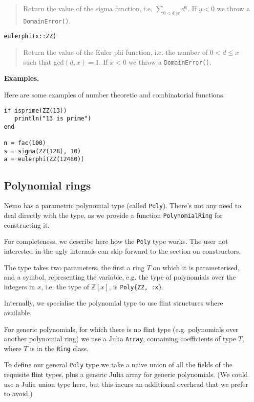 \documentclass[a4paper,10pt]{article}
\newcommand{\Z}{\mathbb{Z}}
\newcommand{\code}{\lstinline}
\newcommand{\desc}[1]{\vspace{-3mm}\begin{quote}#1\end{quote}}
\begin{document}
{{{\desc{Return the value of the sigma function, i.e. $\sum_{0 < d \;| x} d^y$. If $y < 0$
we throw a \code{DomainError()}.}

\begin{lstlisting}
eulerphi(x::ZZ)
\end{lstlisting}

\desc{Return the value of the Euler phi function, i.e. the number of $0 < d \leq x$ such
that gcd$(d, x) = 1$. If $x < 0$ we throw a \code{DomainError()}.}

\textbf{Examples.}

Here are some examples of number theoretic and combinatorial functions.

\begin{lstlisting}
if isprime(ZZ(13))
   println("13 is prime")
end

n = fac(100)
s = sigma(ZZ(128), 10)
a = eulerphi(ZZ(12480))
\end{lstlisting}

\subsection{Polynomial rings}

Nemo has a parametric polynomial type (called \code{Poly}). There's not any need to deal
directly with the type, as we provide a function \code{PolynomialRing} for constructing
it.

For completeness, we describe here how the \code{Poly} type works. The user not interested
in the ugly internals can skip forward to the section on constructors.

The type takes two parameters, the first a ring $T$ on which it is parameterised, and a
symbol, representing the variable, e.g. the type of polynomials over the integers in $x$, 
i.e. the type of $\Z[x]$, is \code|Poly{ZZ, :x}|.

Internally, we specialise the polynomial type to use flint structures where available.

For generic polynomials, for which there is no flint type (e.g. polynomials over another
polynomial ring) we use a Julia \code{Array}, containing coefficients of type $T$, where 
$T$ is in the \code{Ring} class.

To define our general \code{Poly} type we take a naive union of all the fields of the
requisite flint types, plus a generic Julia array for generic polynomials. (We could use
a Julia union type here, but this incurs an additional overhead that we prefer to avoid.)

}}}
\end{document}
